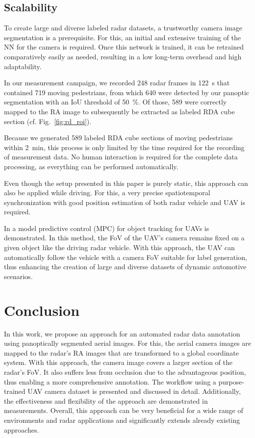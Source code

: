 \documentclass[conference]{IEEEtran}
\begin{document}
%
%
\subsection{Scalability}

To create large and diverse labeled radar datasets, a trustworthy camera image segmentation is a prerequisite.
For this, an initial and extensive training of the NN for the  camera is required.
Once this network is trained, it can be retrained comparatively easily as needed, resulting in a low long-term overhead and high adaptability.

In our measurement campaign, we recorded \num{248} radar frames in \SI{122}{\s} that contained \num{719} moving pedestrians, from which \num{640} were detected by our panoptic segmentation with an IoU threshold of \SI{50}{\percent}.
Of those, \num{589} were correctly mapped to the RA image to subsequently be extracted as labeled RDA cube section (cf. Fig.~\ref{fig:rd_roi}).

Because we generated \num{589} labeled RDA cube sections of moving pedestrians within \SI{2}{\minute}, this process is only limited by the time required for the recording of measurement data.
No human interaction is required for the complete data processing, as everything can be performed automatically.

Even though the setup presented in this paper is purely static, this approach can also be applied while driving.
For this, a very precise spatiotemporal synchronization with good position estimation of both radar vehicle and UAV is required.

In \cite{b21} a model predictive control (MPC) for object tracking for UAVs is demonstrated.
In this method, the FoV of the UAV's camera remains fixed on a given object like the driving radar vehicle.
With this approach, the UAV can automatically follow the vehicle with a camera FoV suitable for label generation, thus enhancing the creation of large and diverse datasets of dynamic automotive scenarios.

%
%
\section{Conclusion}

In this work, we propose an approach for an automated radar data annotation using panoptically segmented aerial images.
For this, the aerial camera images are mapped to the radar's RA images that are transformed to a global coordinate system.
With this approach, the camera image covers a larger section of the radar's FoV.
It also suffers less from occlusion due to the advantageous position, thus enabling a more comprehensive annotation.
The workflow using a purpose-trained UAV camera dataset is presented and discussed in detail.
Additionally, the effectiveness and flexibility of the approach are demonstrated in measurements.
Overall, this approach can be very beneficial for a wide range of environments and radar applications and significantly extends already existing approaches.
\end{document}
